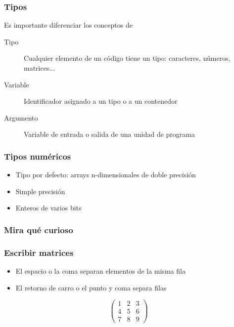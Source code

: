 \documentclass[12pt]{beamer}
\begin{document}
\begin{large}
\begin{frame}
\frametitle{Tipos}
Es importante diferenciar los conceptos de
\begin{description}
  \item[Tipo] Cualquier elemento de un código tiene un tipo:
    caracteres, números, matrices...
  \item[Variable] Identificador asignado a un tipo o a un contenedor
  \item[Argumento] Variable de entrada o salida de una unidad de
    programa
\end{description}
\end{frame}

\begin{frame}
\frametitle{Tipos numéricos}
\begin{itemize}
  \item Tipo por defecto: arrays n-dimensionales de doble precisión
  \item Simple precisión
  \item Enteros de varios bits
\end{itemize}
\end{frame}


\begin{frame}
\frametitle{Mira qué curioso}
\testcode
\end{frame}

\begin{frame}
\frametitle{Escribir matrices}
\begin{itemize}
  \item El espacio o la coma separan elementos de la misma fila
  \item El retorno de carro o el punto y coma separa filas
\end{itemize}
\[ \left(
\begin{array}{ccc}
1&2&3\\
4&5&6\\
7&8&9
\end{array} \right)
\]
\end{frame}




\end{large}
\end{document}
